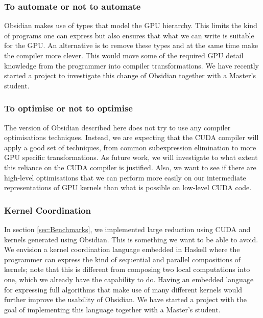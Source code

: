 \subsubsection{To automate or not to automate} 
Obsidian makes use of types that model the GPU hierarchy. This limits 
the kind of programs one can express but also ensures that what we can write 
is suitable for the GPU. An alternative is to remove these types and at the 
same time make the compiler more clever. This would move some of the 
required GPU detail knowledge from the programmer into compiler transformations. 
We have recently started a project to investigate this change of Obsidian
together with a Master's student. 

\subsubsection{To optimise or not to optimise} 
The version of Obsidian described here does not try to use any compiler optimisations techniques. Instead, we are expecting that the 
CUDA compiler will apply a good set of techniques, from common subexpression 
elimination to more GPU specific transformations. As future work, we 
will investigate to what extent this reliance on the CUDA
compiler is justified. Also, we want to 
see if there are high-level optimisations that we can perform more easily 
on our intermediate representations of GPU kernels than what is possible 
on low-level CUDA code. 

\subsubsection{Kernel Coordination} 

In section \ref{sec:Benchmarks}, we implemented large reduction using 
CUDA and kernels generated using Obsidian. This is something we want to 
be able to avoid. We envision a kernel coordination language embedded 
in Haskell where the programmer can express the kind of sequential 
and parallel compositions of kernels; note that this is different from 
composing two local computations into one, which we already have the 
capability to do. Having an embedded language for expressing full 
algorithms that make use of many different kernels would further 
improve the usability of Obsidian. We have started a project with the 
goal of implementing this language together with a Master's student. 


